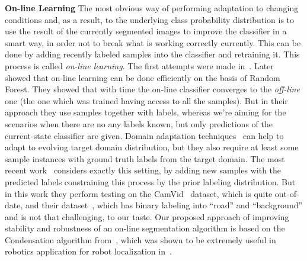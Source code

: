 {\bf On-line Learning} \qquad The most obvious way of performing adaptation to changing conditions and, as a result, to the underlying class 
probability distribution
is to use the result of the currently segmented images to improve the classifier in a smart way, in order not to break what is working
correctly currently. This can be done by adding recently labeled samples into the classifier and retraining it. This process is called
\emph{on-line learning}. The first attempts were made in~\cite{Osa2001}. Later~\cite{Saffari2009} showed that on-line learning can be
done efficiently on the basis of Random Forest. They showed that with time the on-line classifier converges to the \emph{off-line} one
(\ie the one which was trained having access to all the samples). But in their approach they use samples together with labels,
whereas we're aiming for the scenarios when there are no any labels known, but only predictions of the current-state classifier are given.
Domain adaptation techniques~\cite{Saenko2010, Kulis2011} can help to adapt to evolving target domain distribution, but they also require at least some
sample instances with ground truth labels from the target domain.
The most recent work~\cite{Alvarez2012} considers exactly this setting, by adding new samples with the predicted labels constraining
this process by the prior labeling distribution. But in this work they perform testing on the CamVid~\cite{CamVid} dataset, which is 
quite out-of-date, and their dataset~\cite{Alvarez2010}, which has binary labeling into ``road'' and ``background'' and is not that challenging,
to our taste. Our proposed approach of improving stability and robustness of an on-line segmentation algorithm is based on the Condensation algorithm
from~\cite{Isard1998}, which was shown to be extremely useful in robotics application for robot localization in~\cite{Dellaert1999}.

